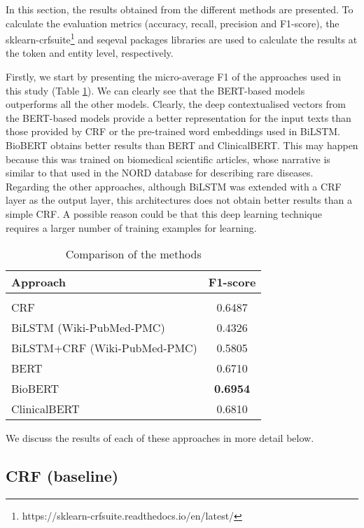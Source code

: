 \documentclass[preprint,12pt]{elsarticle}
\begin{document}
In this section, the  results obtained from the different methods are presented. 
To calculate the evaluation metrics (accuracy, recall, precision and F1-score), the sklearn-crfsuite\footnote{https://sklearn-crfsuite.readthedocs.io/en/latest/} and seqeval \cite{seqeval} packages libraries  are used to calculate the results at the token and entity level, respectively.

Firstly, we start by presenting the micro-average F1 of the approaches used in this study (Table \ref{tab:Summaries}). We can clearly see that the BERT-based models outperforms all the other models. 
Clearly, the deep contextualised vectors from the BERT-based models provide a better representation for the input texts than those provided by CRF or the pre-trained word embeddings used in BiLSTM. BioBERT obtains better results than BERT and ClinicalBERT. This may happen because this was trained on biomedical scientific articles, whose narrative is similar to that used in the NORD database for describing  rare diseases. Regarding the other approaches, although BiLSTM was extended with a CRF layer as the output layer, this architectures does not obtain better results than a simple CRF. A possible reason could be  
that this deep learning technique requires a larger number of training examples for learning. 

\begin{table}[!htbp]
\centering
\small
\caption{\label{tab:Summaries}Comparison of the methods}
\begin{tabular}{lc}
\\
{\bf Approach}&
{\bf F1-score} \\
\hline\\[-8pt]


CRF &	0.6487	\\
BiLSTM (Wiki-PubMed-PMC) &	0.4326\\
BiLSTM+CRF (Wiki-PubMed-PMC)		&	0.5805	\\
BERT  & 0.6710 \\
BioBERT  & \bf 0.6954 \\
ClinicalBERT  & 0.6810\\


\hline
\end{tabular}
\end{table}

We discuss the results of each of these approaches in more detail below.

\subsection{CRF (baseline)}
\end{document}
